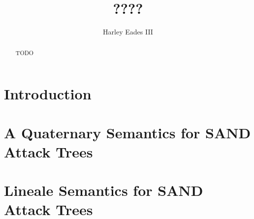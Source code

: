 \documentclass{llncs}
\date{}
\begin{document}
\title{????}

\author{Harley Eades III}

\maketitle 

\begin{abstract}
  TODO
\end{abstract}

\section{Introduction}
\label{sec:introduction}

\section{A Quaternary Semantics for SAND Attack Trees}
\label{sec:a_quaternary_semantics_for_sand_attack_trees}


\section{Lineale Semantics for SAND Attack Trees}
\label{sec:lineale_semantics_for_sand_attack_trees}






\end{document}
